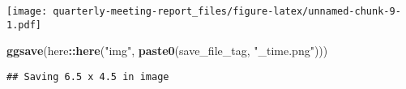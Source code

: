 \documentclass[
]{article}
\newenvironment{Shaded}{\begin{snugshade}}{\end{snugshade}}
\newcommand{\KeywordTok}[1]{\textcolor[rgb]{0.13,0.29,0.53}{\textbf{#1}}}
\newcommand{\NormalTok}[1]{#1}
\newcommand{\OperatorTok}[1]{\textcolor[rgb]{0.81,0.36,0.00}{\textbf{#1}}}
\newcommand{\StringTok}[1]{\textcolor[rgb]{0.31,0.60,0.02}{#1}}
\begin{document}
\texttt{[image: quarterly-meeting-report\_files/figure-latex/unnamed-chunk-9-1.pdf]}

\begin{Shaded}
\begin{Highlighting}[]
\KeywordTok{ggsave}\NormalTok{(here}\OperatorTok{::}\KeywordTok{here}\NormalTok{(}\StringTok{"img"}\NormalTok{, }\KeywordTok{paste0}\NormalTok{(save_file_tag, }\StringTok{"_time.png"}\NormalTok{)))}
\end{Highlighting}
\end{Shaded}

\begin{verbatim}
## Saving 6.5 x 4.5 in image
\end{verbatim}
\end{document}
